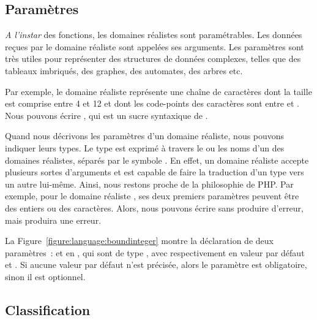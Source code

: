 \subsection{Paramètres}
\label{subsection:language:realdom:parameters}

{\em A l'instar} des fonctions, les domaines réalistes sont {\strong
paramétrables}.  Les données reçues par le domaine réaliste sont appelées ses
{\strong arguments}. Les paramètres sont très utiles pour représenter des
structures de données complexes, telles que des tableaux imbriqués, des graphes,
des automates, des arbres etc.

\begin{example}

Par exemple, le domaine réaliste 
représente une chaîne de caractères dont la taille est comprise entre 4 et 12 et
dont les code-points des caractères sont entre  et . Nous
pouvons écrire , qui est un sucre syntaxique de
.

\end{example}

Quand nous décrivons les paramètres d'un domaine réaliste, nous pouvons indiquer
leurs types. Le type est exprimé à travers le ou les noms d'un des domaines
réalistes, séparés par le symbole \code{$\vert$}. En effet, un domaine réaliste
accepte plusieurs sortes d'arguments et est capable de faire la traduction d'un
type vers un autre lui-même. Ainsi, nous restons proche de la philosophie de
PHP. Par exemple, pour le domaine réaliste , ses deux premiers
paramètres peuvent être des entiers ou des caractères. Alors, nous pouvons
écrire  sans produire d'erreur, mais
 produira une erreur.

La Figure~\ref{figure:language:boundinteger} montre la déclaration de deux
paramètres~:  et  en , qui sont de type
, avec respectivement en valeur par défaut
 et . Si aucune valeur par défaut n'est
précisée, alors le paramètre est {\strong obligatoire}, sinon il est {\strong
optionnel}.

\subsection{Classification}
\label{subsection:language:realdom:classification}

